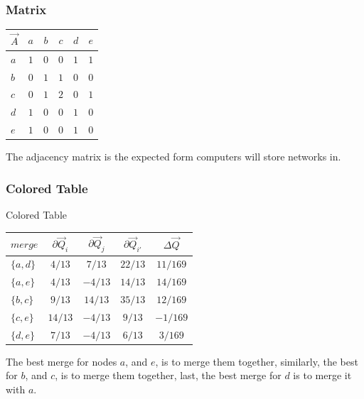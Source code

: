 \documentclass{beamer}
\begin{document}
\begin{frame}

    \frametitle{Matrix}

    \begin{center}
        \begin{tabular}{l | c c c c c}
            $ \vec{A} $ & $ a $ & $ b $ & $ c $ & $ d $ & $ e $ \\
            \hline
            $ a $ & $ 1 $ & $ 0 $ & $ 0 $ & $ 1 $ & $ 1 $ \\
            $ b $ & $ 0 $ & $ 1 $ & $ 1 $ & $ 0 $ & $ 0 $ \\
            $ c $ & $ 0 $ & $ 1 $ & $ 2 $ & $ 0 $ & $ 1 $ \\
            $ d $ & $ 1 $ & $ 0 $ & $ 0 $ & $ 1 $ & $ 0 $ \\
            $ e $ & $ 1 $ & $ 0 $ & $ 0 $ & $ 1 $ & $ 0 $ \\
        \end{tabular}
    \end{center}\pause

    \vspace{2.5mm}
    The adjacency matrix is the expected form computers will store networks in.

\end{frame}

\begin{frame}

    \frametitle{Colored Table}

    Colored Table
    \begin{center}
        \begin{tabular}{l | c c c c}
            $ merge    $ & $ \partial \vec{Q}_{i} $ & $ \partial \vec{Q}_{j} $ & $ \partial \vec{Q}_{i'} $ & $ \Delta \vec{Q} $ \\
            \hline
            \rowcolor{ummaize}
            $ \{a, d\} $ & $ 4/13  $ & $  7/13  $ & $ 22/13 $ & $ 11/169 $ \\
            \rowcolor{ummaize}
            $ \{a, e\} $ & $ 4/13  $ & $ -4/13  $ & $ 14/13 $ & $ 14/169 $ \\
            \rowcolor{ummaize}
            $ \{b, c\} $ & $  9/13 $ & $  14/13 $ & $ 35/13 $ & $ 12/169 $ \\
            $ \{c, e\} $ & $ 14/13 $ & $ -4/13  $ & $  9/13 $ & $ -1/169 $ \\
            $ \{d, e\} $ & $  7/13 $ & $ -4/13  $ & $  6/13 $ & $  3/169 $ \\
        \end{tabular}
    \end{center}\pause

    \vspace{2.5mm}
    The best merge for nodes $ a $, and $ e $, is to merge them together, similarly, the best for $ b $, and $ c $, is to merge them together, last, the best merge for $ d $ is to merge it with $ a $.

\end{frame}
\end{document}
